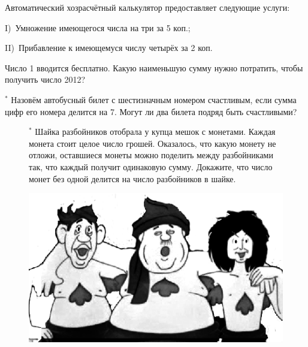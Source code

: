    \begin{thm}
    Автоматический хозрасчётный калькулятор предоставляет следующие услуги:
    \par 
    I)~Умножение имеющегося числа на три за 5 коп.; 
    \par
    II)~Прибавление к имеющемуся числу четырёх за 2 коп. 
    \par
    Число 1 вводится бесплатно. Какую наименьшую сумму нужно потратить, чтобы получить число 2012?
\end{thm}

\begin{thm}$^{\ast}$
Назовём автобусный билет с шестизначным номером счастливым, если сумма цифр его номера делится на 7. Могут ли два билета подряд быть счастливыми?
\end{thm}
{
\setlength{\intextsep}{0pt}
\begin{figure}[h]
\begin{minipage}[h]{0.72\linewidth}\setlength{\parindent}{1.5em}
    \begin{thm}$^{\ast}$
    Шайка разбойников отобрала у купца мешок с монетами. Каждая монета стоит целое число грошей. Оказалось, что какую монету не отложи, оставшиеся монеты можно поделить между разбойниками так, что каждый получит одинаковую сумму. Докажите, что число монет без одной делится на число разбойников в шайке.
    \end{thm}
\end{minipage}
\hfill
\begin{minipage}[h]{0.25\linewidth}
    \includegraphics[width=0.9\columnwidth]{./img/razboi}
\end{minipage}
\end{figure}
}
